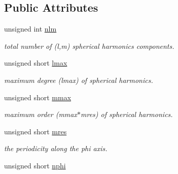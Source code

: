 \subsection*{Public Attributes}
\begin{DoxyCompactItemize}
\item 
\hypertarget{structshtns__info_abd15108a5e4f0687f42a67b1b64a9a47}{}unsigned int \hyperlink{structshtns__info_abd15108a5e4f0687f42a67b1b64a9a47}{nlm}\label{structshtns__info_abd15108a5e4f0687f42a67b1b64a9a47}

\begin{DoxyCompactList}\small\item\em total number of (l,m) spherical harmonics components. \end{DoxyCompactList}\item 
\hypertarget{structshtns__info_a8a5c45a1fd2227abb668a3b3a4259509}{}unsigned short \hyperlink{structshtns__info_a8a5c45a1fd2227abb668a3b3a4259509}{lmax}\label{structshtns__info_a8a5c45a1fd2227abb668a3b3a4259509}

\begin{DoxyCompactList}\small\item\em maximum degree (lmax) of spherical harmonics. \end{DoxyCompactList}\item 
\hypertarget{structshtns__info_a38cd0b51312d467b68c2de264b66997b}{}unsigned short \hyperlink{structshtns__info_a38cd0b51312d467b68c2de264b66997b}{mmax}\label{structshtns__info_a38cd0b51312d467b68c2de264b66997b}

\begin{DoxyCompactList}\small\item\em maximum order (mmax$\ast$mres) of spherical harmonics. \end{DoxyCompactList}\item 
\hypertarget{structshtns__info_aecf1d8b5744c247e04a0318136390a58}{}unsigned short \hyperlink{structshtns__info_aecf1d8b5744c247e04a0318136390a58}{mres}\label{structshtns__info_aecf1d8b5744c247e04a0318136390a58}

\begin{DoxyCompactList}\small\item\em the periodicity along the phi axis. \end{DoxyCompactList}\item 
\hypertarget{structshtns__info_a4e3a22a9dff6a9cf670fc007fb974a7c}{}unsigned short \hyperlink{structshtns__info_a4e3a22a9dff6a9cf670fc007fb974a7c}{nphi}\label{structshtns__info_a4e3a22a9dff6a9cf670fc007fb974a7c}


\end{DoxyCompactItemize}
